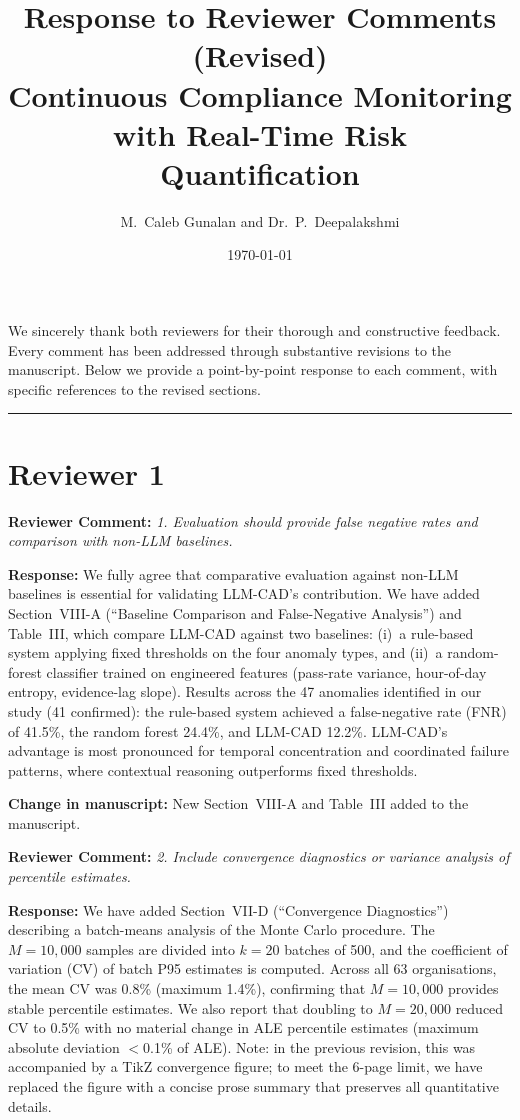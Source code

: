 \documentclass[11pt]{article}
\title{Response to Reviewer Comments (Revised)\\[6pt]
\large Continuous Compliance Monitoring with Real-Time Risk Quantification}
\author{M.~Caleb Gunalan and Dr.~P.~Deepalakshmi}
\date{\today}
\newcommand{\RC}[1]{\medskip\noindent\textbf{\color{reviewer}Reviewer Comment:} \textit{#1}\par\medskip}
\newcommand{\RE}[1]{\noindent\textbf{\color{response}Response:} #1\par}
\newcommand{\CH}[1]{\noindent\textbf{\color{change}Change in manuscript:} #1\par\medskip}
\begin{document}
\maketitle

We sincerely thank both reviewers for their thorough and constructive feedback. Every comment has been addressed through substantive revisions to the manuscript. Below we provide a point-by-point response to each comment, with specific references to the revised sections.

\bigskip
\hrule
\bigskip

\section*{Reviewer 1}

\RC{1. Evaluation should provide false negative rates and comparison with non-LLM baselines.}

\RE{We fully agree that comparative evaluation against non-LLM baselines is essential for validating LLM-CAD's contribution. We have added Section~VIII-A (``Baseline Comparison and False-Negative Analysis'') and Table~III, which compare LLM-CAD against two baselines: (i)~a rule-based system applying fixed thresholds on the four anomaly types, and (ii)~a random-forest classifier trained on engineered features (pass-rate variance, hour-of-day entropy, evidence-lag slope). Results across the 47 anomalies identified in our study (41 confirmed): the rule-based system achieved a false-negative rate (FNR) of 41.5\%, the random forest 24.4\%, and LLM-CAD 12.2\%. LLM-CAD's advantage is most pronounced for temporal concentration and coordinated failure patterns, where contextual reasoning outperforms fixed thresholds.}

\CH{New Section~VIII-A and Table~III added to the manuscript.}

\RC{2. Include convergence diagnostics or variance analysis of percentile estimates.}

\RE{We have added Section~VII-D (``Convergence Diagnostics'') describing a batch-means analysis of the Monte Carlo procedure. The $M{=}10{,}000$ samples are divided into $k{=}20$ batches of 500, and the coefficient of variation (CV) of batch P95 estimates is computed. Across all 63 organisations, the mean CV was 0.8\% (maximum 1.4\%), confirming that $M{=}10{,}000$ provides stable percentile estimates. We also report that doubling to $M{=}20{,}000$ reduced CV to 0.5\% with no material change in ALE percentile estimates (maximum absolute deviation $<$0.1\% of ALE). Note: in the previous revision, this was accompanied by a TikZ convergence figure; to meet the 6-page limit, we have replaced the figure with a concise prose summary that preserves all quantitative details.}
\end{document}
